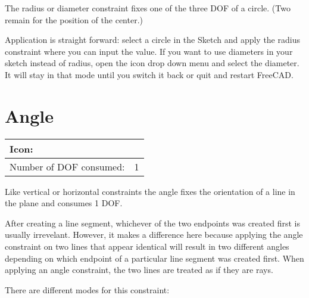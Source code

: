 \documentclass[12pt,titlepage]{article}
\newcommand{\icon}[1]{\raisebox{-1em}{\rule{0pt}{27pt}\texttt{[image: images/\#1]}}}
\newcommand{\dofConsumed}{Number of DOF consumed:}
\begin{document}
The radius or diameter constraint fixes one of the three DOF of a circle. (Two remain for the position of the center.)

Application is straight forward: select a circle in the Sketch and apply the radius constraint where you can input the value. If you want to use diameters in your sketch instead of radius, open the icon drop down menu and select the diameter. It will stay in that mode until you switch it back or quit and restart FreeCAD.

\section{Angle} \label{Angle} \begin{tabular}{|l|l|} \hline Icon: & \icon{Constraint_InternalAngle}\\ \hline \dofConsumed & 1 \\ \hline \end{tabular}

Like vertical or horizontal constraints the angle fixes the orientation of a line in the plane and consumes 1 DOF.

After creating a line segment, whichever of the two endpoints was created first is usually irrevelant.  However, it makes a difference here because applying the angle constraint on two lines that appear identical will result in two different angles depending on which endpoint of a particular line segment was created first.  When applying an angle constraint, the two lines are treated as if they are rays.

There are different modes for this constraint:
\end{document}
